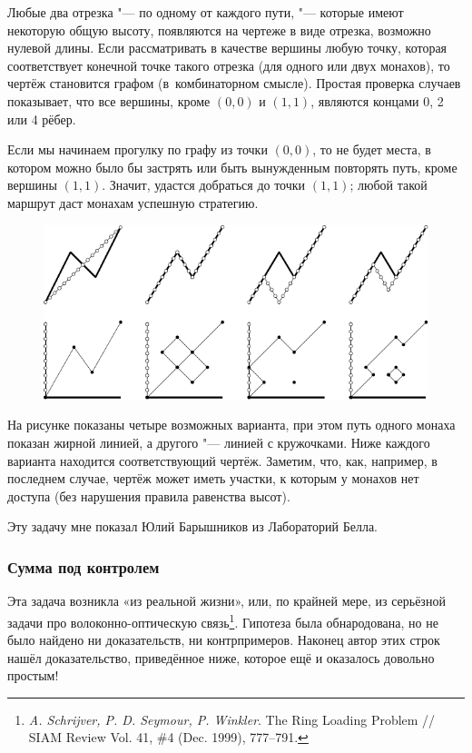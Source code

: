 \documentclass[twoside]{book}
\begin{document}
Любые два отрезка "--- по одному от каждого пути, "--- которые имеют некоторую общую высоту, появляются на чертеже в виде отрезка, возможно нулевой длины.
Если рассматривать в качестве вершины любую точку, которая соответствует конечной точке такого отрезка (для одного или двух монахов), то чертёж становится графом (в~комбинаторном смысле).
Простая проверка случаев показывает, что все вершины, кроме $(0,0)$ и $(1,1)$, являются концами 0, 2 или 4 рёбер.


Если мы начинаем прогулку по графу из точки $(0,0)$, то не будет места, в котором можно было бы застрять или быть вынужденным повторять путь, кроме вершины $(1,1)$.
Значит, удастся добраться до точки $(1,1)$; любой такой маршрут даст монахам успешную стратегию.
\heart

\begin{figure}[h]
\centering
 \includegraphics{mp/wink-27}
\end{figure} 


На рисунке показаны четыре возможных варианта, при этом путь одного монаха показан жирной линией, а другого "--- линией с кружочками.
Ниже каждого варианта находится соответствующий чертёж.
Заметим, что, как, например, в последнем случае, чертёж может иметь участки, к которым у монахов нет доступа (без нарушения правила равенства высот).


Эту задачу мне показал Юлий Барышников из Лабораторий Белла.

\subsubsection*{Сумма под контролем}

Эта задача возникла «из реальной жизни», или, по крайней мере, из серьёзной задачи про волоконно-оптическую связь\footnote{\emph{A. Schrijver, P. D. Seymour, P. Winkler}. The Ring Loading Problem /\!/ {SIAM Review} Vol. 41, \#4 (Dec. 1999), 777--791.}.
Гипотеза была обнародована, но не было найдено ни доказательств, ни контрпримеров.
Наконец автор этих строк нашёл доказательство, приведённое ниже, которое ещё и оказалось довольно простым!
\end{document}
